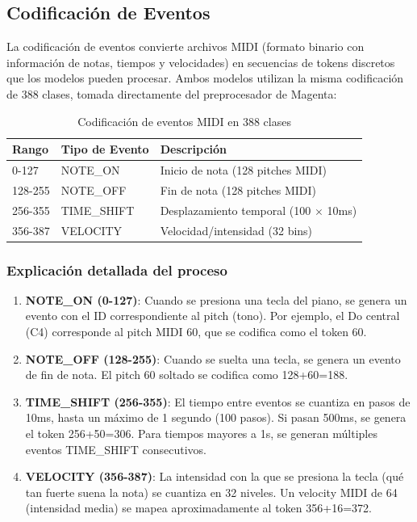 \documentclass[12pt,a4paper]{article}
\begin{document}
\subsection{Codificación de Eventos}
La codificación de eventos convierte archivos MIDI (formato binario con información de notas, tiempos y velocidades) en secuencias de tokens discretos que los modelos pueden procesar. Ambos modelos utilizan la misma codificación de 388 clases, tomada directamente del preprocesador de Magenta:

\begin{table}[H]
\centering
\begin{tabular}{lll}
\toprule
\textbf{Rango} & \textbf{Tipo de Evento} & \textbf{Descripción} \\
\midrule
0-127 & NOTE\_ON & Inicio de nota (128 pitches MIDI) \\
128-255 & NOTE\_OFF & Fin de nota (128 pitches MIDI) \\
256-355 & TIME\_SHIFT & Desplazamiento temporal (100 $\times$ 10ms) \\
356-387 & VELOCITY & Velocidad/intensidad (32 bins) \\
\bottomrule
\end{tabular}
\caption{Codificación de eventos MIDI en 388 clases}
\end{table}

\subsubsection{Explicación detallada del proceso}
\begin{enumerate}
    \item \textbf{NOTE\_ON (0-127)}: Cuando se presiona una tecla del piano, se genera un evento con el ID correspondiente al pitch (tono). Por ejemplo, el Do central (C4) corresponde al pitch MIDI 60, que se codifica como el token 60.

    \item \textbf{NOTE\_OFF (128-255)}: Cuando se suelta una tecla, se genera un evento de fin de nota. El pitch 60 soltado se codifica como 128+60=188.

    \item \textbf{TIME\_SHIFT (256-355)}: El tiempo entre eventos se cuantiza en pasos de 10ms, hasta un máximo de 1 segundo (100 pasos). Si pasan 500ms, se genera el token 256+50=306. Para tiempos mayores a 1s, se generan múltiples eventos TIME\_SHIFT consecutivos.

    \item \textbf{VELOCITY (356-387)}: La intensidad con la que se presiona la tecla (qué tan fuerte suena la nota) se cuantiza en 32 niveles. Un velocity MIDI de 64 (intensidad media) se mapea aproximadamente al token 356+16=372.
\end{enumerate}
\end{document}
